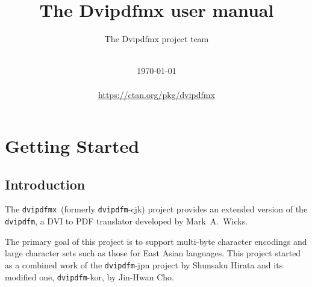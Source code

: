 \documentclass[a4paper,xetex,11pt]{report}
\title{The Dvipdfmx user manual}
\author{The Dvipdfmx project team}
\date{%
      \hspace*{1em}\\ \today\\
      \hspace*{1em}\\ \url{https://ctan.org/pkg/dvipdfmx}
     }
\newcommand{\dvipdfm}{\texttt{dvipdfm}}
\newcommand{\dvipdfmx}{\texttt{dvipdfmx}}
\begin{document}
\maketitle


\tableofcontents

\chapter{Getting Started}

\section{Introduction}

The \dvipdfmx\ (formerly \dvipdfm-cjk) project provides an extended version of
the \dvipdfm, a DVI to PDF translator developed by Mark~A.~Wicks.

The primary goal of this project is to support multi-byte character encodings
and large character sets such as those for East Asian languages.
This project started as a combined work of the \dvipdfm-jpn project by
Shunsaku Hirata and its modified one, \dvipdfm-kor, by Jin-Hwan Cho.
\end{document}
